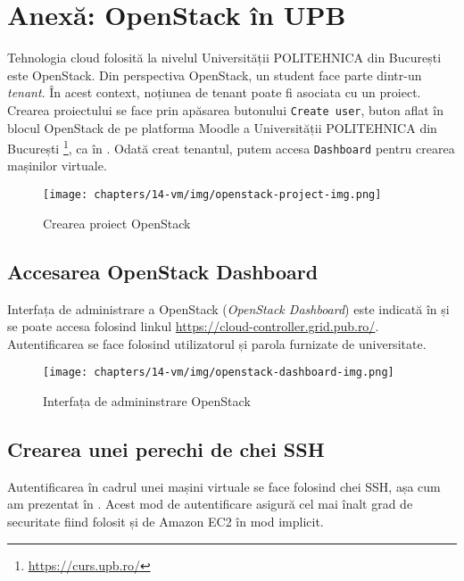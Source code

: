 \section{Anexă: OpenStack în UPB}
\label{sec:vm:upb-openstack}

Tehnologia cloud folosită la nivelul Universității POLITEHNICA din București este OpenStack.
Din perspectiva OpenStack, un student face parte dintr-un \textit{tenant}.
În acest context, noțiunea de tenant poate fi asociata cu un
proiect. Crearea proiectului se face prin apăsarea butonului \texttt{Create user}, buton
aflat în blocul OpenStack de pe platforma Moodle a Universității POLITEHNICA din București
\footnote{\url{https://curs.upb.ro/}}, ca în . Odată
creat tenantul, putem accesa \texttt{Dashboard} pentru crearea mașinilor virtuale.

\begin{figure}[!htbp]
  \centering
  \texttt{[image: chapters/14-vm/img/openstack-project-img.png]}
  \caption{Crearea proiect OpenStack}
  \label{fig:vm:openstack-project}
\end{figure}

\subsection{Accesarea OpenStack Dashboard}
\label{sec:vm:upb-openstack:dashboard}

Interfața de administrare a OpenStack (\textit{OpenStack Dashboard}) este indicată în  și se poate accesa
folosind linkul \url{https://cloud-controller.grid.pub.ro/}. Autentificarea se face
folosind utilizatorul și parola furnizate de universitate.

\begin{figure}[!htbp]
  \centering
  \texttt{[image: chapters/14-vm/img/openstack-dashboard-img.png]}
  \caption{Interfața de admininstrare OpenStack}
  \label{fig:vm:openstack-dashboard}
\end{figure}

\subsection{Crearea unei perechi de chei SSH}
\label{sec:vm:upb-openstack:keys}

Autentificarea în cadrul unei mașini virtuale se face folosind chei SSH, așa cum am prezentat în . Acest mod de autentificare asigură cel mai înalt grad de securitate fiind folosit și de Amazon EC2 în mod implicit.

